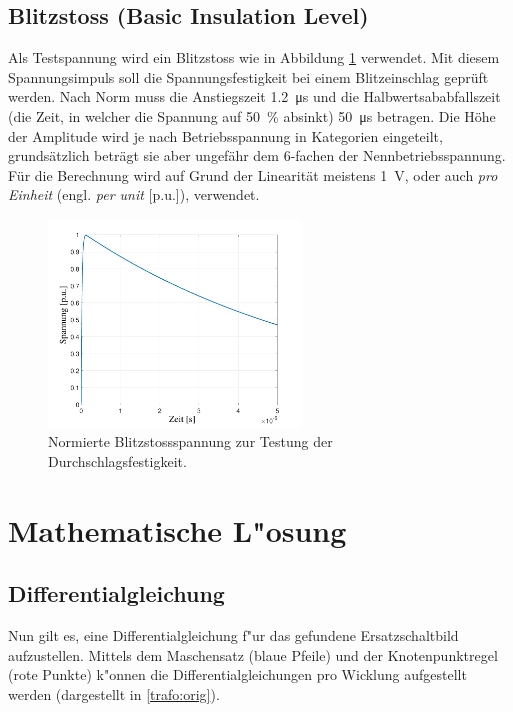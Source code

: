 \begin{refsection}
\subsection{Blitzstoss (\textbf{B}asic \textbf{I}nsulation \textbf{L}evel)}
Als Testspannung wird ein Blitzstoss wie in Abbildung \ref{trafo:BIL} verwendet. Mit diesem Spannungsimpuls soll die Spannungsfestigkeit bei einem Blitzeinschlag geprüft werden. Nach Norm muss die Anstiegszeit \SI{1.2}{\micro \second} und die Halbwertsababfallszeit (die Zeit, in welcher die Spannung auf \SI{50}{\percent} absinkt) \SI{50}{\micro \second} betragen. Die Höhe der Amplitude wird je nach Betriebsspannung in Kategorien eingeteilt, grundsätzlich beträgt sie aber ungefähr dem 6-fachen der Nennbetriebsspannung. Für die Berechnung wird auf Grund der Linearität meistens \SI{1}{\volt}, oder auch \textit{pro Einheit} (engl. \textit{per unit} [p.u.]), verwendet. 

\begin{figure}
	\centering
	\includegraphics[width=0.6\textwidth]{./Trafo/images/pulse.pdf}
	\caption{Normierte Blitzstossspannung zur Testung der Durchschlagsfestigkeit.}
	\label{trafo:BIL}
\end{figure}

\section{Mathematische L"osung}
\subsection{Differentialgleichung}

Nun gilt es, eine Differentialgleichung f"ur das gefundene Ersatzschaltbild aufzustellen. Mittels dem Maschensatz (blaue Pfeile) und der Knotenpunktregel (rote Punkte) k"onnen die Differentialgleichungen pro Wicklung aufgestellt werden (dargestellt in \ref{trafo:orig}).


\end{refsection}
